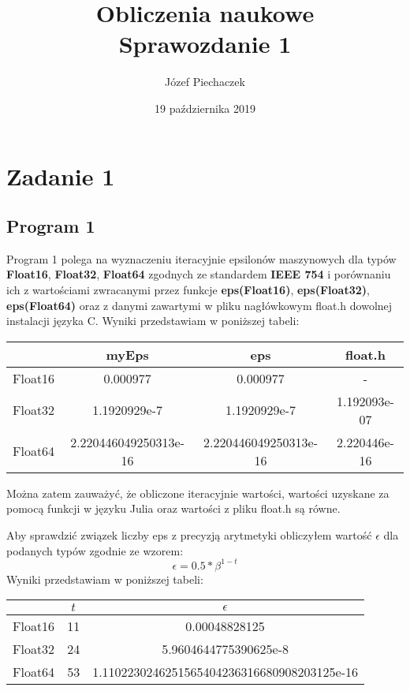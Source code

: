 \documentclass[12pt]{article}
\title{
	Obliczenia naukowe \\
	Sprawozdanie 1
}
\date{19 października 2019}
\author{Józef Piechaczek}
\begin{document}
\maketitle
\newpage
{}

\setlength{\abovedisplayskip}{5pt}
\setlength{\belowdisplayskip}{5pt}

\section{Zadanie 1}
\subsection{Program 1}
Program 1 polega na wyznaczeniu iteracyjnie epsilonów maszynowych dla typów \textbf{Float16}, \textbf{Float32}, \textbf{Float64} zgodnych ze standardem \textbf{IEEE 754} i porównaniu ich z wartościami zwracanymi przez funkcje \textbf{eps(Float16)}, \textbf{eps(Float32)}, \textbf{eps(Float64)} oraz z danymi zawartymi w pliku nagłówkowym float.h dowolnej instalacji języka C. Wyniki przedstawiam w poniższej tabeli:

\begin{table}[h]
	\centering
    \label{tab:table1}
    \begin{tabular}{|c|c|c|c|}
    		\hline
      	& myEps & eps & float.h\\
		\hline
		Float16 & 0.000977 & 0.000977 & - \\
		\hline
		Float32 & 1.1920929e-7 & 1.1920929e-7 & 1.192093e-07 \\
		\hline
		Float64 & 2.220446049250313e-16 & 2.220446049250313e-16 & 2.220446e-16 \\
		\hline
    \end{tabular}
\end{table}

Można zatem zauważyć, że obliczone iteracyjnie wartości, wartości uzyskane za pomocą funkcji w języku Julia oraz wartości z pliku float.h są równe.

Aby sprawdzić związek liczby eps z precyzją arytmetyki obliczyłem wartość $\epsilon$ dla podanych typów zgodnie ze wzorem:
\begin{equation*}
	\epsilon = 0.5 * \beta^{1-t}
\end{equation*}
Wyniki przedstawiam w poniższej tabeli:
\begin{table}[h!]
	\centering
    \label{tab:table1}
    \begin{tabular}{|c|c|c|}
    		\hline
      	& $t$ & $\epsilon$\\
		\hline
		Float16 & 11 & 0.00048828125\\
		\hline
		Float32 & 24 & 5.9604644775390625e-8\\
		\hline
		Float64 & 53 & 1.1102230246251565404236316680908203125e-16\\
		\hline
    \end{tabular}
\end{table}
\end{document}
